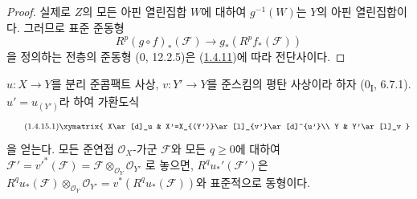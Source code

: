 \begin{proof}
실제로 $Z$의 모든 아핀 열린집합 $W$에 대하여 $g^{-1}(W)$는 $Y$의
아핀 열린집합이다. 그러므로 표준 준동형
\[
R^p(g\circ f)_*(\mathcal F)\longrightarrow g_*(R^pf_*(\mathcal F))
\]
을 정의하는 전층의 준동형 (0, 12.2.5)은
(\hyperref[III.1.4.11-fr]{1.4.11})에 따라 전단사이다.
\end{proof}

\begin{proposition}[1.4.15]
\label{III.1.4.15-fr}
$u:X\to Y$를 분리 준콤팩트 사상, $v:Y'\to Y$를 준스킴의 평탄 사상이라
하자 (0\textsubscript{I}, 6.7.1). $u'=u_{(Y')}$라 하여 가환도식
\begin{equation}
\label{III.1.4.15.1-fr}
\tag{1.4.15.1}
\xymatrix{
X\ar[d]_u & X'=X_{(Y')}\ar[l]_{v'}\ar[d]^{u'}\\
Y & Y'\ar[l]_v
}
\end{equation}
을 얻는다. 모든 준연접 $\mathcal O_X$-가군 $\mathcal F$와 모든
$q\geq0$에 대하여
$\mathcal F'=v'^*(\mathcal F)=\mathcal F\otimes_{\mathcal O_Y}\mathcal O_{Y'}$
로 놓으면, $R^qu_*'(\mathcal F')$은
$R^qu_*(\mathcal F)\otimes_{\mathcal O_Y}\mathcal O_{Y'}
=v^*(R^qu_*(\mathcal F))$와 표준적으로 동형이다.
\end{proposition}

